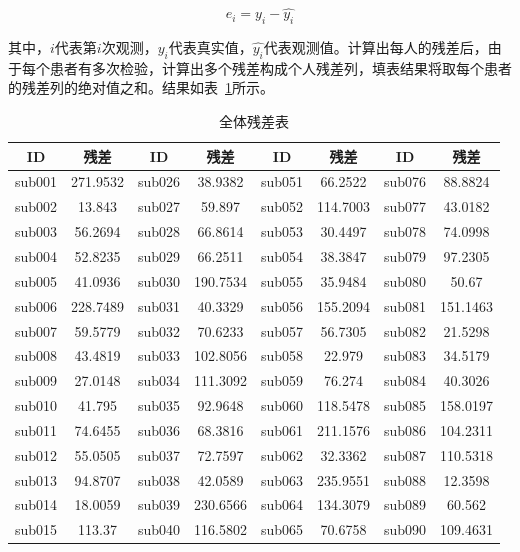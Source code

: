 \documentclass[bwprint]{gmcmthesis}
\begin{document}
\begin{equation}\label{残差公式}
e_i = y_i-\hat{y_i}
\end{equation}

\noindent 其中，$i$代表第$i$次观测，$y_i$代表真实值，$\hat{y_i}$代表观测值。计算出每人的残差后，由于每个患者有多次检验，计算出多个残差构成个人残差列，填表结果将取每个患者的残差列的绝对值之和。结果如表~\ref{全体残差表}所示。

\begin{table}[!ht]
    \centering
    \begin{spacing}{0.7}
    \caption{全体残差表}
    \label{全体残差表}
    \begin{tabular}{cccccccc}
    \hline
        ID & 残差 & ID & 残差 & ID & 残差 & ID & 残差 \\ \hline
        sub001 & 271.9532 & sub026 & 38.9382 & sub051 & 66.2522 & sub076 & 88.8824 \\ 
        sub002 & 13.843 & sub027 & 59.897 & sub052 & 114.7003 & sub077 & 43.0182 \\ 
        sub003 & 56.2694 & sub028 & 66.8614 & sub053 & 30.4497 & sub078 & 74.0998 \\ 
        sub004 & 52.8235 & sub029 & 66.2511 & sub054 & 38.3847 & sub079 & 97.2305 \\ 
        sub005 & 41.0936 & sub030 & 190.7534 & sub055 & 35.9484 & sub080 & 50.67 \\ 
        sub006 & 228.7489 & sub031 & 40.3329 & sub056 & 155.2094 & sub081 & 151.1463 \\ 
        sub007 & 59.5779 & sub032 & 70.6233 & sub057 & 56.7305 & sub082 & 21.5298 \\ 
        sub008 & 43.4819 & sub033 & 102.8056 & sub058 & 22.979 & sub083 & 34.5179 \\ 
        sub009 & 27.0148 & sub034 & 111.3092 & sub059 & 76.274 & sub084 & 40.3026 \\ 
        sub010 & 41.795 & sub035 & 92.9648 & sub060 & 118.5478 & sub085 & 158.0197 \\ 
        sub011 & 74.6455 & sub036 & 68.3816 & sub061 & 211.1576 & sub086 & 104.2311 \\ 
        sub012 & 55.0505 & sub037 & 72.7597 & sub062 & 32.3362 & sub087 & 110.5318 \\ 
        sub013 & 94.8707 & sub038 & 42.0589 & sub063 & 235.9551 & sub088 & 12.3598 \\ 
        sub014 & 18.0059 & sub039 & 230.6566 & sub064 & 134.3079 & sub089 & 60.562 \\ 
        sub015 & 113.37 & sub040 & 116.5802 & sub065 & 70.6758 & sub090 & 109.4631 \\ 

\end{tabular}
\end{spacing}
\end{table}
\end{document}
